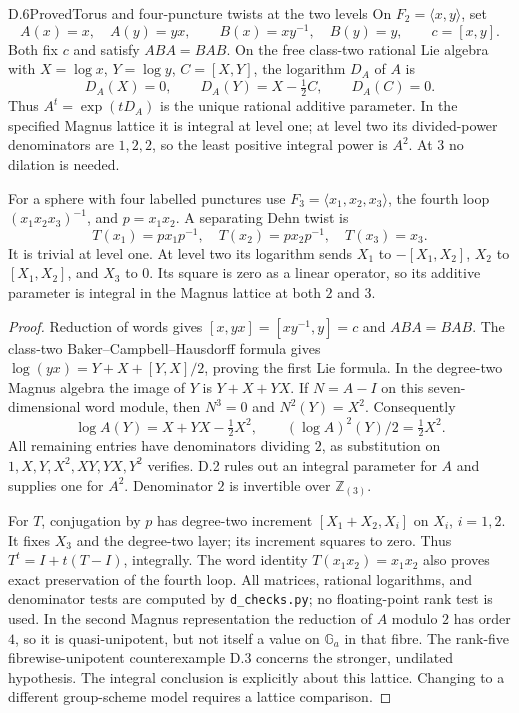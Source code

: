 \begin{statement}{D.6}{Proved}{Torus and four-puncture twists at the two levels}
On $F_2=\langle x,y\rangle$, set
\[
 A(x)=x,\quad A(y)=yx,\qquad
 B(x)=xy^{-1},\quad B(y)=y,
 \qquad c=[x,y].
\]
Both fix $c$ and satisfy $ABA=BAB$.  On the free class-two rational
Lie algebra with $X=\log x$, $Y=\log y$, $C=[X,Y]$, the logarithm
$D_A$ of $A$ is
\[
 D_A(X)=0,\qquad D_A(Y)=X-\tfrac12C,\qquad D_A(C)=0.
\]
Thus $A^t=\exp(tD_A)$ is the unique rational additive parameter.
In the specified Magnus lattice it is integral at level one;
at level two its divided-power denominators are $1,2,2$, so the
least positive integral power is $A^2$.  At $3$ no dilation is needed.

For a sphere with four labelled punctures use
$F_3=\langle x_1,x_2,x_3\rangle$, the fourth loop
$(x_1x_2x_3)^{-1}$, and $p=x_1x_2$.  A separating Dehn twist is
\[
 T(x_1)=px_1p^{-1},\quad T(x_2)=px_2p^{-1},\quad T(x_3)=x_3.
\]
It is trivial at level one.  At level two its logarithm sends
$X_1$ to $-[X_1,X_2]$, $X_2$ to $[X_1,X_2]$, and $X_3$ to $0$.
Its square is zero as a linear operator, so its additive parameter
is integral in the Magnus lattice at both $2$ and $3$.
\end{statement}
\begin{proof}
Reduction of words gives $[x,yx]=[xy^{-1},y]=c$ and $ABA=BAB$.
The class-two Baker--Campbell--Hausdorff formula gives
$\log(yx)=Y+X+[Y,X]/2$, proving the first Lie formula.  In the
degree-two Magnus algebra the image of $Y$ is $Y+X+YX$.
If $N=A-I$ on this seven-dimensional word module, then
$N^3=0$ and $N^2(Y)=X^2$.  Consequently
\[
 \log A(Y)=X+YX-\tfrac12X^2,
 \qquad (\log A)^2(Y)/2=\tfrac12X^2.
\]
All remaining entries have denominators dividing $2$, as substitution
on $1,X,Y,X^2,XY,YX,Y^2$ verifies.  D.2 rules out an integral
parameter for $A$ and supplies one for $A^2$.  Denominator $2$ is
invertible over $\mathbb Z_{(3)}$.

For $T$, conjugation by $p$ has degree-two increment
$[X_1+X_2,X_i]$ on $X_i$, $i=1,2$.  It fixes $X_3$ and the
degree-two layer; its increment squares to zero.  Thus
$T^t=I+t(T-I)$, integrally.  The word identity
$T(x_1x_2)=x_1x_2$ also proves exact preservation of the fourth
loop.  All matrices, rational logarithms, and denominator tests are
computed by \texttt{d\_checks.py}; no floating-point rank test is used.
In the second Magnus representation the reduction of $A$ modulo $2$
has order $4$, so it is quasi-unipotent, but not itself a value on
$\mathbb G_a$ in that fibre.  The rank-five fibrewise-unipotent
counterexample D.3 concerns the stronger, undilated hypothesis.
The integral conclusion is explicitly about this lattice.  Changing
to a different group-scheme model requires a lattice comparison.
\end{proof}

